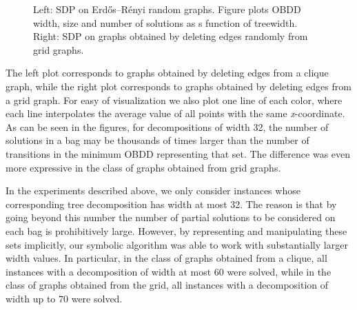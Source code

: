 \begin{figure}[t]
    \begin{subfigure}{0.48\textwidth}
        \centering
         \resizebox{\textwidth}{!}{}
        \label{fig:clique}
    \end{subfigure}
    \hfill
    \begin{subfigure}{0.48\textwidth}       
    \centering
    \resizebox{\textwidth}{!}{}
        \label{fig:grid}
    \end{subfigure}
    \caption{Left: SDP on Erd\H{o}s--R\'enyi random graphs. Figure plots OBDD width, size and number of solutions as s function of treewidth. Right: SDP on graphs obtained by deleting edges randomly from grid graphs. \label{fig:ComparisonSizes}}
   
\end{figure}

The left plot corresponds to graphs obtained by deleting edges from a clique graph, while the right plot corresponds to graphs obtained by deleting edges from a grid graph. 
For easy of visualization we also plot one line of each color, where each line interpolates the average value of all points with the same \textit{x}-coordinate. As can be seen in the figures, for decompositions of width 32, the number of solutions in a bag may be thousands of times larger than the number of transitions in the minimum OBDD representing that set. The difference was even more expressive in the class of graphs obtained from grid graphs. 

In the experiments described above, we only consider instances whose corresponding tree decomposition has width at most 32. The reason is that by going beyond this number the number of partial solutions to be considered on each bag is prohibitively large. However, by representing and manipulating these sets implicitly, our symbolic algorithm was able to work with substantially larger width values. In particular, in the class of graphs obtained from a clique, all instances with a decomposition of width at most 60 were solved, while in the class of graphs obtained from the grid, all instances with a decomposition of width up to $70$ were solved. 

